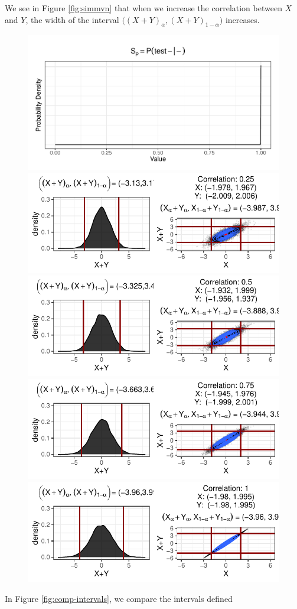 \documentclass[12pt,twoside]{smiththesis}
\begin{document}
We see in Figure \ref{fig:simmvn} that when we increase the correlation between \(X\) and \(Y\), the width of the interval \(\Big((X+Y)_\alpha, (X+Y)_{1-\alpha}\Big)\) increases.
\begin{figure}

{\centering \includegraphics[width=0.96\linewidth]{thesis_files/figure-latex/unnamed-chunk-63-1} \includegraphics[width=0.96\linewidth]{thesis_files/figure-latex/unnamed-chunk-63-2} \includegraphics[width=0.96\linewidth]{thesis_files/figure-latex/unnamed-chunk-63-3} \includegraphics[width=0.96\linewidth]{thesis_files/figure-latex/unnamed-chunk-63-4} \includegraphics[width=0.96\linewidth]{thesis_files/figure-latex/unnamed-chunk-63-5} 

}

\caption{\label{fig:simmvn}}\label{fig:unnamed-chunk-63}
\end{figure}
In Figure \ref{fig:comp-intervals}, we compare the intervals defined
\end{document}
